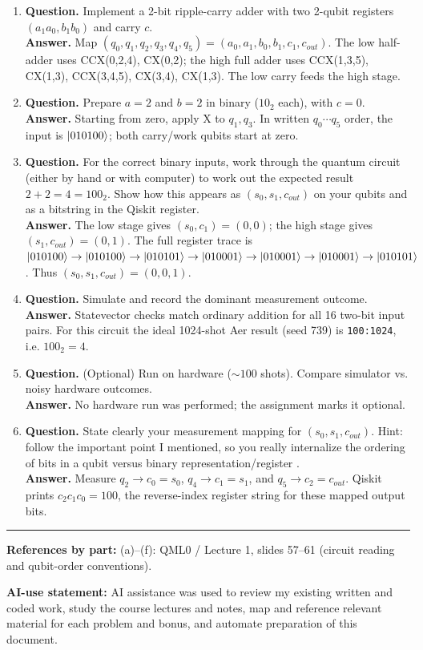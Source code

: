 \documentclass[
  11pt]{article}
\newcounter{problem}
\newcounter{bonus}
\newcommand{\pagereferences}[1]{%
  \vfill
  \noindent\rule{\textwidth}{0.3pt}\par
  {\scriptsize\textbf{References by part:} #1\par}
}
\begin{document}
\scriptsize
\begin{enumerate}[label=\textbf{(\alph*)},leftmargin=*,itemsep=1pt,topsep=1pt,parsep=0pt]
\item \textbf{Question.} Implement a 2-bit ripple-carry adder with two 2-qubit registers \((a_1a_0,b_1b_0)\) and carry \(c\).\\
\textbf{Answer.} Map \((q_0,q_1,q_2,q_3,q_4,q_5)=(a_0,a_1,b_0,b_1,c_1,c_{out})\). The low half-adder uses CCX(0,2,4), CX(0,2); the high full adder uses CCX(1,3,5), CX(1,3), CCX(3,4,5), CX(3,4), CX(1,3). The low carry feeds the high stage.
\item \textbf{Question.} Prepare \(a=2\) and \(b=2\) in binary (\(10_2\) each), with \(c=0\).\\
\textbf{Answer.} Starting from zero, apply X to \(q_1,q_3\). In written \(q_0\cdots q_5\) order, the input is \(\ket{010100}\); both carry/work qubits start at zero.
\item \textbf{Question.} For the correct binary inputs, work through the quantum circuit (either by hand or with computer) to work out the expected result \(2+2=4=100_2\). Show how this appears as \((s_0,s_1,c_{out})\) on your qubits and as a bitstring in the Qiskit register.\\
\textbf{Answer.} The low stage gives \((s_0,c_1)=(0,0)\); the high stage gives \((s_1,c_{out})=(0,1)\). The full register trace is \(\ket{010100}\to\ket{010100}\to\ket{010101}\to\ket{010001}\to\ket{010001}\to\ket{010001}\to\ket{010101}\). Thus \((s_0,s_1,c_{out})=(0,0,1)\).
\item \textbf{Question.} Simulate and record the dominant measurement outcome.\\
\textbf{Answer.} Statevector checks match ordinary addition for all 16 two-bit input pairs. For this circuit the ideal 1024-shot Aer result (seed 739) is \texttt{100:1024}, i.e. \(100_2=4\).
\item \textbf{Question.} (Optional) Run on hardware (\(\sim 100\) shots). Compare simulator vs. noisy hardware outcomes.\\
\textbf{Answer.} No hardware run was performed; the assignment marks it optional.
\item \textbf{Question.} State clearly your measurement mapping for \((s_0,s_1,c_{out})\). Hint: follow the important point I mentioned, so you really internalize the ordering of bits in a qubit versus binary representation/register \smiley{}.\\
\textbf{Answer.} Measure \(q_2\to c_0=s_0\), \(q_4\to c_1=s_1\), and \(q_5\to c_2=c_{out}\). Qiskit prints \(c_2c_1c_0=100\), the reverse-index register string for these mapped output bits.
\end{enumerate}
\normalsize
\pagereferences{(a)--(f): QML0 / Lecture 1, slides 57--61 (circuit reading and qubit-order conventions).}

\vfill
\begin{center}
\scriptsize\textbf{AI-use statement:} AI assistance was used to review my existing written and coded work, study the course lectures and notes, map and reference relevant material for each problem and bonus, and automate preparation of this document.
\end{center}
\end{document}
